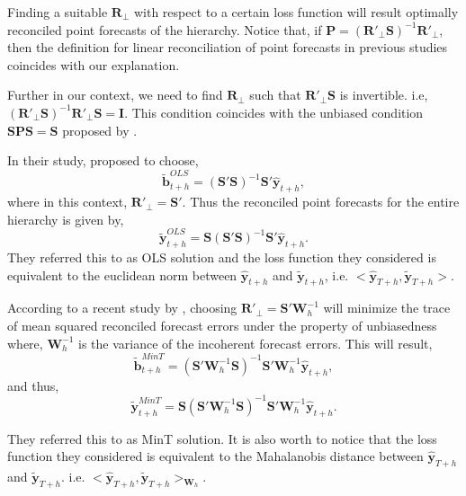 \documentclass[a4paper, 11pt]{article}
\begin{document}
Finding a suitable $\bm{R}_\bot$ with respect to a certain loss function will result optimally reconciled point forecasts of the hierarchy. Notice that, if $\bm{P}=(\bm{R}'_\bot \bm{S})^{-1}\bm{R}'_\bot$, then the definition for linear reconciliation of point forecasts in previous studies coincides with our explanation.

Further in our context, we need to find $\bm{R}_\bot$ such that $\bm{R}'_\bot \bm{S}$ is invertible. i.e, $(\bm{R}'_\bot \bm{S})^{-1}\bm{R}'_\bot \bm{S}=\bm{I}$. This condition coincides with the unbiased condition $\bm{SPS}=\bm{S}$ proposed by \citet{Hyndman2011}.

In their study, \citet{Hyndman2011} proposed to choose,
\begin{equation*}
\tilde{\bm{b}}^{OLS}_{t+h}=(\bm{S}' \bm{S})^{-1}\bm{S}' \hat{\bm{y}}_{t+h},
\end{equation*}
where in this context, $\bm{R}'_\bot = \bm{S}'$. Thus the reconciled point forecasts for the entire hierarchy is given by,
\begin{equation}
\tilde{\bm{y}}^{OLS}_{t+h}=\bm{S}(\bm{S}' \bm{S})^{-1}\bm{S}' \hat{\bm{y}}_{t+h}.
\end{equation}
They referred this to as OLS solution and the loss function they considered is equivalent to the euclidean norm between $\hat{\bm{y}}_{t+h}$ and $\tilde{\bm{y}}_{t+h}$, i.e. $<\hat{\bm{y}}_{T+h}, \tilde{\bm{y}}_{T+h}>$.

According to a recent study by \citet{Wickramasuriya2017}, choosing $\bm{R}'_\bot = \bm{S}'\bm{W}^{-1}_{h}$ will minimize the trace of mean squared reconciled forecast errors under the property of unbiasedness where, $\bm{W}^{-1}_{h}$ is the variance of the incoherent forecast errors. This will result,
\begin{equation*}
\tilde{\bm{b}}^{MinT}_{t+h}=(\bm{S}'\bm{W}^{-1}_{h} \bm{S})^{-1}\bm{S}'\bm{W}^{-1}_{h} \hat{\bm{y}}_{t+h},
\end{equation*}
and thus,
\begin{equation}
\tilde{\bm{y}}^{MinT}_{t+h}=\bm{S}(\bm{S}' \bm{W}^{-1}_{h}\bm{S})^{-1}\bm{S}'\bm{W}^{-1}_{h} \hat{\bm{y}}_{t+h}.
\end{equation}

They referred this to as MinT solution. It is also worth to notice that the loss function they considered is equivalent to the Mahalanobis distance between $\hat{\bm{y}}_{T+h}$ and $\tilde{\bm{y}}_{T+h}$. i.e. $<\hat{\bm{y}}_{T+h}, \tilde{\bm{y}}_{T+h}>_{\bm{W}_h}$.
\end{document}
